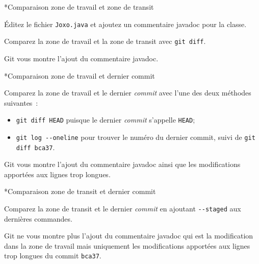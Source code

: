 \documentclass[a4paper,11pt]{style-esi/td}
\begin{document}
\begin{Exercice}*{Comparaison zone de travail et zone de transit}
	\begin{steps}
		
	\item Éditez le fichier \texttt{Joxo.java} et ajoutez un commentaire javadoc
		pour la classe. 
	\item Comparez la zone de travail et la zone de transit avec \texttt{git diff}.
	
		Git vous montre l'ajout du commentaire javadoc.    

	\end{steps}
	
	
\end{Exercice}

\pagebreak
\begin{Exercice}*{Comparaison zone de travail et dernier commit}
	\begin{steps}
		
		\item Comparez la zone de travail et le dernier \textit{commit} avec l'une des
			deux méthodes suivantes : 
			\begin{itemize}
				\item \texttt{git diff HEAD} puisque le dernier \textit{commit} s'appelle 
					\texttt{HEAD};
				\item \texttt{git log -{}-oneline} pour trouver le numéro du dernier
					commit, suivi de \texttt{git diff bca37}.
			\end{itemize}

			Git vous montre l'ajout du commentaire javadoc ainsi que les 
			modifications apportées aux lignes trop longues. 

	\end{steps}
	
\end{Exercice}

\begin{Exercice}*{Comparaison zone de transit et dernier commit}
	\begin{steps}
		
		\item Comparez la zone de transit et le dernier \textit{commit} en ajoutant 
			\texttt{-{}-staged} aux dernières commandes. 

			Git ne vous montre plus l'ajout du commentaire javadoc qui est la
			modification dans la zone de travail mais uniquement les
			modifications apportées aux lignes trop longues du commit
			\texttt{bca37}. 

	\end{steps}
	
\end{Exercice}
\end{document}
